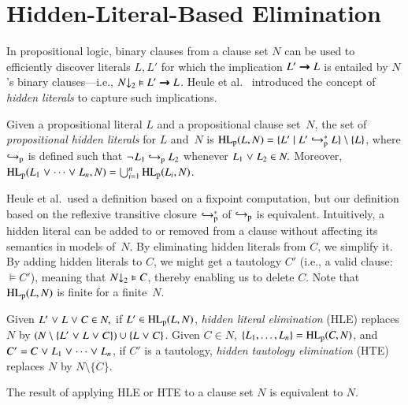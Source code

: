 \section{Hidden-Literal-Based Elimination}
\label{sec:satfol:hidden-literal-based-elimination}

In propositional logic, binary clauses from a clause set $N$ can be used to
efficiently discover literals $L, L'$ for which the implication $L' \impl L$
is entailed by $N$'s binary clauses---i.e., $\binset{N} \models L' \impl L$.
Heule et al.\ \cite{hjb-2011-big-simplification} introduced the concept of \emph{hidden
literals} to capture such implications.

\begin{defi}
   Given a propositional literal $L$ and a propositional clause set~$N$, the
   set of \emph{propositional hidden literals} for $L$ and~$N$ is
   $\PHL(L, N) = \{ L' \mid L' \bigpimpl{N}^\ast L \} \setminus \{ L \}$, where $\bigpimpl{N}$ is
   defined such that $\neglit{L_1} \bigpimpl{N} L_2$ whenever $L_1 \cor L_2 \in N.$
   Moreover, $\PHL(L_1 \cor \cdots \cor L_n, N) = \bigcup_{i=1}^n
   \PHL(L_i, N)$.
\end{defi}

Heule et al.\ used a definition based on a fixpoint computation, but our
definition based on the reflexive transitive closure $\bigpimpl{N}^\ast$ of $\bigpimpl{N}$ is equivalent. Intuitively,
a hidden literal can be added to or removed from a clause without affecting its
semantics in models of~$N.$ By eliminating hidden literals from $C$, we simplify
it. By adding hidden literals to $C$, we might get a tautology $C'$ (i.e., a
valid clause:\ $\models C'$), meaning that $\binset{N} \models C$, thereby
enabling us to delete $C$. Note that $\PHL(L,N)$ is finite for a finite~$N.$

\begin{defi}
   \label{def:hle}\label{def:hte}
   Given $L' \cor L \cor C \in N,$ if $L' \in
   \PHL(L, N)$, \emph{hidden literal elimination} (HLE) replaces $N$ by $(N
   \setminus \{L' \cor L \cor C\}) \cup \{L \cor C\}$.
   Given $C \in N$, $\{L_1,\dots,L_n\} = \PHL(C, N)$, and $C' = C \cor L_1 \cor
   \cdots \cor L_n$, if $C'$ is a tautology, \emph{hidden
   tautology elimination} (HTE) replaces $N$ by $N \setminus \{C\}$.
\end{defi}

\begin{theorem}
   The result of applying HLE or HTE to a clause set $N$ is
   equivalent to $N$.
\end{theorem}

